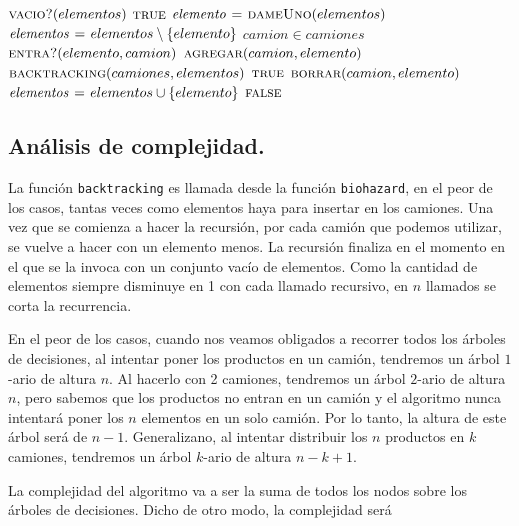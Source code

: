 \vspace*{0.5cm}


\begin{codebox}
\li \If $\textnormal{\scshape vacio?}(elementos)$
\li     \Then
            \Return $\textnormal{\scshape true}$
        \End
\li $\id{elemento} \gets \proc{dameUno}(elementos)$
\li $\id{elementos} \gets elementos \setminus \{elemento\}$
\li \For $camion \in camiones$
\li     \Do
            \If $\textnormal{\scshape entra?}(elemento, camion)$
\li             \Then
                    $\textnormal{\scshape agregar}(camion, elemento)$
\li                 \If $\textnormal{\scshape backtracking}(camiones, elementos)$
                        \Then
\li                         \Return $\textnormal{\scshape true}$
\li                 \Else
\li                     $\textnormal{\scshape borrar}(camion, elemento)$
                    \End
            \End
        \End
\li $\id{elementos} \gets elementos \cup \{elemento\}$
\li \Return $\textnormal{\scshape false}$
\end{codebox}



\newpage
\subsection{Análisis de complejidad.}

\vspace*{0.3cm}


La función \verb|backtracking| es llamada desde la función \verb|biohazard|, en
el peor de los casos, tantas veces como elementos haya para insertar en los camiones.
Una vez que se comienza a hacer la recursión, por cada camión que podemos utilizar,
se vuelve a hacer con un elemento menos. La recursión finaliza en el momento en
el que se la invoca con un conjunto vacío de elementos. Como la cantidad de
elementos siempre disminuye en 1 con cada llamado recursivo, en $n$ llamados se
corta la recurrencia.

En el peor de los casos, cuando nos veamos obligados a recorrer
todos los árboles de decisiones, al intentar poner los productos en un
camión, tendremos un árbol $1$-ario de altura $n$. Al hacerlo con 2
camiones, tendremos un árbol $2$-ario de altura $n$, pero sabemos que los
productos no entran en un camión y el algoritmo nunca intentará poner los
$n$ elementos en un solo camión. Por lo tanto, la altura de este árbol será
de $n - 1$. Generalizano, al intentar distribuir los $n$ productos en $k$
camiones, tendremos un árbol $k$-ario de altura $n - k + 1$.

La complejidad del algoritmo va a ser la suma de todos los nodos sobre
los árboles de decisiones. Dicho de otro modo, la complejidad será

